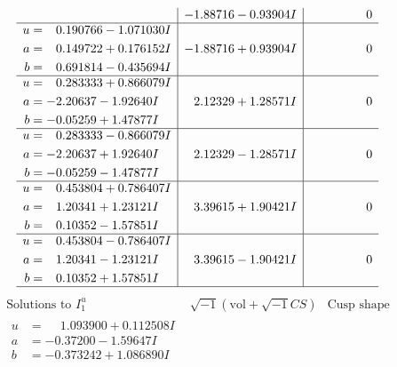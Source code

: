 \documentclass[1p]{elsarticle_modified}
\theoremstyle{definition}
\newcommand{\I}{\sqrt{-1}}
\begin{document}
$$\begin{array}{c|c|c}
 & -1.88716 - 0.93904 I & \phantom{-0.000000 } 0 \\ \hline\begin{aligned}
u &= \phantom{-}0.190766 - 1.071030 I \\
a &= \phantom{-}0.149722 + 0.176152 I \\
b &= \phantom{-}0.691814 - 0.435694 I\end{aligned}
 & -1.88716 + 0.93904 I & \phantom{-0.000000 } 0 \\ \hline\begin{aligned}
u &= \phantom{-}0.283333 + 0.866079 I \\
a &= -2.20637 - 1.92640 I \\
b &= -0.05259 + 1.47877 I\end{aligned}
 & \phantom{-}2.12329 + 1.28571 I & \phantom{-0.000000 } 0 \\ \hline\begin{aligned}
u &= \phantom{-}0.283333 - 0.866079 I \\
a &= -2.20637 + 1.92640 I \\
b &= -0.05259 - 1.47877 I\end{aligned}
 & \phantom{-}2.12329 - 1.28571 I & \phantom{-0.000000 } 0 \\ \hline\begin{aligned}
u &= \phantom{-}0.453804 + 0.786407 I \\
a &= \phantom{-}1.20341 + 1.23121 I \\
b &= \phantom{-}0.10352 - 1.57851 I\end{aligned}
 & \phantom{-}3.39615 + 1.90421 I & \phantom{-0.000000 } 0 \\ \hline\begin{aligned}
u &= \phantom{-}0.453804 - 0.786407 I \\
a &= \phantom{-}1.20341 - 1.23121 I \\
b &= \phantom{-}0.10352 + 1.57851 I\end{aligned}
 & \phantom{-}3.39615 - 1.90421 I & \phantom{-0.000000 } 0\\
 \hline 
 \end{array}$$\newpage$$\begin{array}{c|c|c}  
\text{Solutions to }I^u_{1}& \I (\text{vol} + \sqrt{-1}CS) & \text{Cusp shape}\\
 \hline 
\begin{aligned}
u &= \phantom{-}1.093900 + 0.112508 I \\
a &= -0.37200 - 1.59647 I \\
b &= -0.373242 + 1.086890 I\end{aligned}

\end{array}$$
\end{document}
